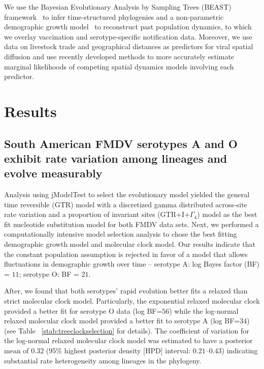 \documentclass[10pt]{article}
\begin{document}
We use the Bayesian Evolutionary Analysis by Sampling Trees (BEAST) framework~\cite{beast2012} to infer time-structured phylogenies and a non-parametric demographic growth model~\cite{skyride} to reconstruct past population dynamics, to which we overlay  vaccination and serotype-specific notification data.
Moreover, we use data on livestock trade and geographical distances as predictors for viral spatial diffusion and use recently developed methods to more accurately estimate marginal likelihoods of competing spatial dynamics models involving each predictor.

\section*{Results}

\subsection*{South American FMDV serotypes A and O exhibit rate variation among lineages and evolve measurably}

Analysis using jModelTest to select the evolutionary model yielded the general time reversible (GTR) model with a discretized gamma distributed across-site rate variation and a proportion of invariant sites (GTR+I+$\Gamma_{4}$) model as the best fit nucleotide substitution model for both FMDV data sets.
Next, we performed a computationally intensive model selection analysis to chose the best fitting demographic growth model and molecular clock model.
Our results indicate that the constant population assumption is rejected in favor of a model that allows fluctuations in demographic growth over time -- serotype A: log Bayes factor (BF) = $11$; serotype O: BF = $21$. %

After, we found that both serotypes' rapid evolution better fits a relaxed than strict molecular clock model.
Particularly, the exponential relaxed molecular clock provided a better fit for serotype O data (log BF=$56$) while the log-normal relaxed molecular clock model provided a better fit to serotype A (log BF=$34$) 
(see Table ~\ref{stab:treeclockselection} for details). 
The coefficient of variation for the log-normal relaxed molecular clock model was estimated to have a posterior mean of $0.32$ (95\% highest posterior density [HPD] interval: $ 0.21$--$0.43$) 
indicating substantial rate heterogeneity among lineages in the phylogeny. 
\end{document}
